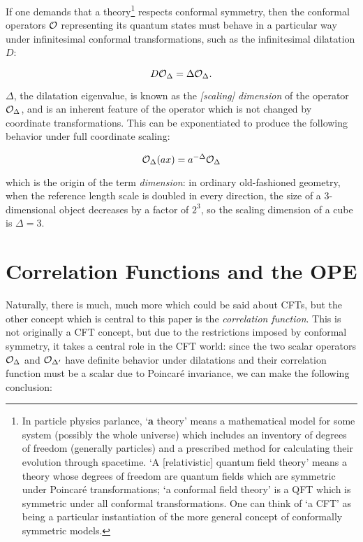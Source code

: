 If one demands that a theory\footnote{In particle physics parlance, `\textbf{a} 
theory' means a mathematical model for some system (possibly the whole universe)
which includes an inventory of degrees of freedom (generally particles) and a 
prescribed method for calculating their evolution through spacetime. `A 
[relativistic] quantum field theory' means a theory whose degrees of freedom are
quantum fields which are symmetric under Poincar\'e transformations; `a 
conformal field theory' is a QFT which is symmetric under all conformal 
transformations. One can think of `a CFT' as being a particular instantiation of
the more general concept of conformally symmetric models.} respects conformal
symmetry, then the conformal operators ${\cal O}$ representing its quantum 
states must behave in a particular way under infinitesimal conformal 
transformations, such as the infinitesimal dilatation $D$:

\begin{equation}
    D {\cal O}_\Delta = \Delta {\cal O}_\Delta.
\end{equation}

$\Delta$, the dilatation eigenvalue, is known as the \emph{[scaling] dimension}
of the operator ${\cal O}_\Delta$, and is an inherent feature of the operator
which is not changed by coordinate transformations. This can be exponentiated to
produce the following behavior under full coordinate scaling:

\begin{equation}
    {\cal O}_\Delta (a x) = a^{-\Delta} {\cal O}_\Delta
\end{equation}

which is the origin of the term \emph{dimension}: in ordinary old-fashioned 
geometry, when the reference length scale is doubled in every direction, the 
size of a 3-dimensional object decreases by a factor of $2^3$, so the scaling 
dimension of a cube is $\Delta = 3$.

\section{Correlation Functions and the OPE}
\label{sec:correlators}

Naturally, there is much, much more which could be said about CFTs, but the
other concept which is central to this paper is the \emph{correlation function}.
This is not originally a CFT concept, but due to the restrictions imposed by
conformal symmetry, it takes a central role in the CFT world: since the two
scalar operators ${\cal O}_\Delta$ and ${\cal O}_{\Delta'}$ have definite
behavior under dilatations and their correlation function must be a scalar due
to Poincar\'e invariance, we can make the following conclusion:

